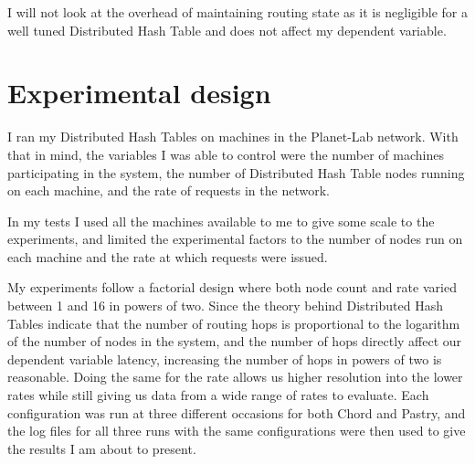 I will not look at the overhead of maintaining routing state as it is negligible for a well tuned Distributed Hash Table \cite{myths} and does not affect my dependent variable.

\section{Experimental design}
I ran my Distributed Hash Tables on machines in the Planet-Lab network. With that in mind, the variables I was able to control were the number of machines participating in the system, the number of Distributed Hash Table nodes running on each machine, and the rate of requests in the network.

In my tests I used all the machines available to me to give some scale to the experiments, and limited the experimental factors to the number of nodes run on each machine and the rate at which requests were issued.

My experiments follow a factorial design where both node count and rate varied between 1 and 16 in powers of two. Since the theory behind Distributed Hash Tables indicate that the number of routing hops is proportional to the logarithm of the number of nodes in the system, and the number of hops directly affect our dependent variable latency, increasing the number of hops in powers of two is reasonable. Doing the same for the rate allows us higher resolution into the lower rates while still giving us data from a wide range of rates to evaluate.
Each configuration was run at three different occasions for both Chord and Pastry, and the log files for all three runs with the same configurations were then used to give the results I am about to present.

